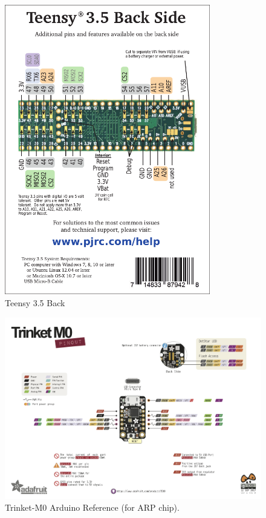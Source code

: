 \documentclass{article}
\begin{document}
\begin{figure}[H]
    \centering
    \includegraphics[width=0.8\textwidth]{images/card8b_rev2.pdf}
    \caption{Teensy 3.5 Back}
    \label{fig:teensy-back}
\end{figure}


\begin{figure}[H]
    \centering
    \includegraphics[width=\textwidth]{images/trinket-m0.png}
    \caption{Trinket-M0 Arduino Reference (for ARP chip).}
    \label{fig:trinket-m0}
\end{figure}
\end{document}
